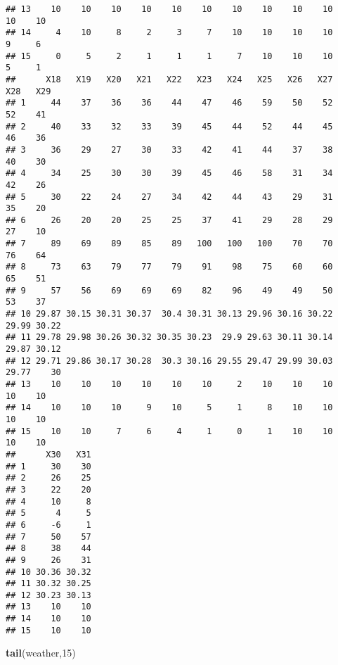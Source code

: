 \documentclass[]{article}
\newenvironment{Shaded}{\begin{snugshade}}{\end{snugshade}}
\newcommand{\KeywordTok}[1]{\textcolor[rgb]{0.13,0.29,0.53}{\textbf{#1}}}
\newcommand{\DecValTok}[1]{\textcolor[rgb]{0.00,0.00,0.81}{#1}}
\newcommand{\NormalTok}[1]{#1}
\begin{document}
\begin{verbatim}
## 13    10    10    10    10    10    10    10    10    10    10    10    10
## 14     4    10     8     2     3     7    10    10    10    10     9     6
## 15     0     5     2     1     1     1     7    10    10    10     5     1
##      X18   X19   X20   X21   X22   X23   X24   X25   X26   X27   X28   X29
## 1     44    37    36    36    44    47    46    59    50    52    52    41
## 2     40    33    32    33    39    45    44    52    44    45    46    36
## 3     36    29    27    30    33    42    41    44    37    38    40    30
## 4     34    25    30    30    39    45    46    58    31    34    42    26
## 5     30    22    24    27    34    42    44    43    29    31    35    20
## 6     26    20    20    25    25    37    41    29    28    29    27    10
## 7     89    69    89    85    89   100   100   100    70    70    76    64
## 8     73    63    79    77    79    91    98    75    60    60    65    51
## 9     57    56    69    69    69    82    96    49    49    50    53    37
## 10 29.87 30.15 30.31 30.37  30.4 30.31 30.13 29.96 30.16 30.22 29.99 30.22
## 11 29.78 29.98 30.26 30.32 30.35 30.23  29.9 29.63 30.11 30.14 29.87 30.12
## 12 29.71 29.86 30.17 30.28  30.3 30.16 29.55 29.47 29.99 30.03 29.77    30
## 13    10    10    10    10    10    10     2    10    10    10    10    10
## 14    10    10    10     9    10     5     1     8    10    10    10    10
## 15    10    10     7     6     4     1     0     1    10    10    10    10
##      X30   X31
## 1     30    30
## 2     26    25
## 3     22    20
## 4     10     8
## 5      4     5
## 6     -6     1
## 7     50    57
## 8     38    44
## 9     26    31
## 10 30.36 30.32
## 11 30.32 30.25
## 12 30.23 30.13
## 13    10    10
## 14    10    10
## 15    10    10
\end{verbatim}

\begin{Shaded}
\begin{Highlighting}[]
\KeywordTok{tail}\NormalTok{(weather,}\DecValTok{15}\NormalTok{)}
\end{Highlighting}
\end{Shaded}
\end{document}
